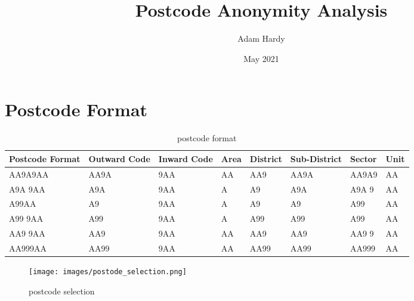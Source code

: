 \documentclass[12pt, a4paper]{article}
\title{Postcode Anonymity Analysis}
\author{Adam Hardy}
\date{May 2021}
\begin{document}
\maketitle
\cleardoublepage
{}%

\section{Postcode Format}
\begin{table}
\begin{center}
	\begin{tabular}{ >{\centering\arraybackslash}m{} | >{\centering\arraybackslash}m{} | >{\centering\arraybackslash}m{} | >{\centering\arraybackslash}m{} | >{\centering\arraybackslash}m{} | >{\centering\arraybackslash}m{} | >{\centering\arraybackslash}m{} | >{\centering\arraybackslash}m{}}
		Postcode Format & Outward Code & Inward Code & Area & District & Sub-District & Sector & Unit \\ \hline
		AA9A9AA & AA9A & 9AA & AA & AA9 & AA9A & AA9A9 & AA \\
        A9A 9AA & A9A & 9AA & A & A9 & A9A & A9A 9 & AA \\
        A9\space\space9AA & A9 & 9AA & A & A9 & A9 & A99 & AA \\
        A99 9AA & A99 & 9AA & A & A99 & A99 & A99 & AA \\
        AA9 9AA & AA9 & 9AA & AA & AA9 & AA9 & AA9 9 & AA \\
        AA999AA & AA99 & 9AA  & AA & AA99 & AA99 & AA999 & AA\\
	\end{tabular}
\end{center}
\label{table:postcode_format}
\caption{postcode format}
\end{table}

\begin{figure}
\texttt{[image: images/postode\_selection.png]}
\label{fig:postcode_selection}
\caption{postcode selection}
\end{figure}
\end{document}
